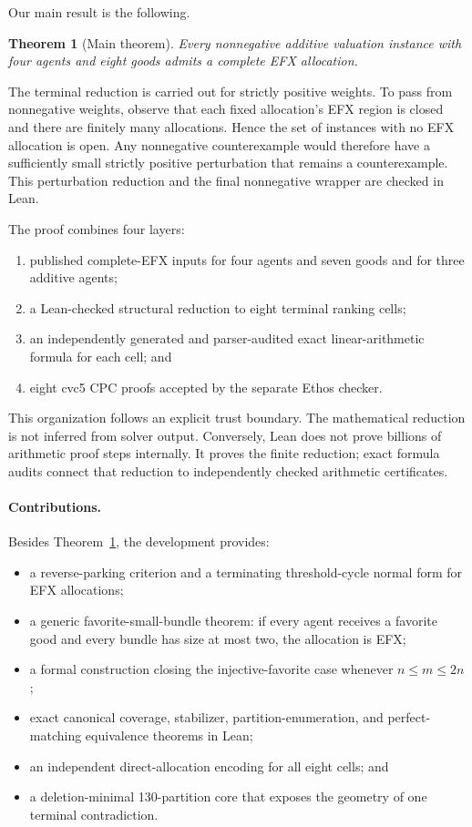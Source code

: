 \documentclass[11pt]{article}
\newtheorem{theorem}{Theorem}[section]
\theoremstyle{definition}
\begin{document}
Our main result is the following.

\begin{theorem}[Main theorem]\label{thm:main}
Every nonnegative additive valuation instance with four agents and
eight goods admits a complete EFX allocation.
\end{theorem}

The terminal reduction is carried out for strictly positive weights. To pass
from nonnegative weights, observe that each fixed allocation's EFX region is
closed and there are finitely many allocations. Hence the set of instances
with no EFX allocation is open. Any nonnegative counterexample would therefore
have a sufficiently small strictly positive perturbation that remains a
counterexample. This perturbation reduction and the final nonnegative wrapper
are checked in Lean.

The proof combines four layers:
\begin{enumerate}[leftmargin=2.1em]
  \item published complete-EFX inputs for four agents and seven goods and for
  three additive agents;
  \item a Lean-checked structural reduction to eight terminal ranking cells;
  \item an independently generated and parser-audited exact linear-arithmetic
  formula for each cell; and
  \item eight cvc5 CPC proofs accepted by the separate Ethos checker.
\end{enumerate}

This organization follows an explicit trust boundary. The mathematical
reduction is not inferred from solver output. Conversely, Lean does not prove
billions of arithmetic proof steps internally. It proves the finite
reduction; exact formula audits connect that reduction to independently
checked arithmetic certificates.

\paragraph{Contributions.}
Besides Theorem~\ref{thm:main}, the development provides:
\begin{itemize}[leftmargin=1.8em]
  \item a reverse-parking criterion and a terminating threshold-cycle normal
  form for EFX allocations;
  \item a generic favorite-small-bundle theorem: if every agent receives a
  favorite good and every bundle has size at most two, the allocation is EFX;
  \item a formal construction closing the injective-favorite case whenever
  $n\le m\le2n$;
  \item exact canonical coverage, stabilizer, partition-enumeration, and
  perfect-matching equivalence theorems in Lean;
  \item an independent direct-allocation encoding for all eight cells; and
  \item a deletion-minimal 130-partition core that exposes the geometry of
  one terminal contradiction.
\end{itemize}
\end{document}

